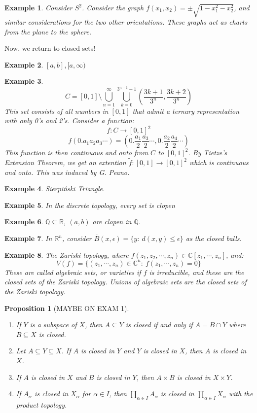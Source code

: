 \documentclass{article}
\newcommand{\R}{\mathbb{R}}
\newcommand{\C}{\mathbb{C}}
\newcommand{\Q}{\mathbb{Q}}
\newtheorem{example}{Example}
\newtheorem{proposition}{Proposition}
\begin{document}
 \begin{example}
 Consider $S^2$. Consider the graph $f(x_1,x_2)=\pm\sqrt{1-x_1^2-x_2^2}$, and similar considerations for the two other orientations. These graphs act as charts from the plane to the sphere.  
 \end{example}
 \noindent Now, we return to closed sets!
 \begin{example}
 $[a,b], [a,\infty)$
 \end{example}
 \begin{example}
 $$C=[0,1]\setminus\displaystyle\bigcup_{n=1}^\infty \bigcup_{k=0}^{3^{n-1}-1}\left(\frac{3k+1}{3^n},\frac{3k+2}{3^n}\right)$$
 This set consists of all numbers in $[0,1]$ that admit a ternary representation with only 0's and 2's. Consider a function:
 $$f: C\rightarrow [0,1]^2$$
 $$f(0.a_1a_2a_3\cdots) = (0.\frac{a_1}{2}\frac{a_3}{2}\cdots, 0.\frac{a_2}{2}\frac{a_4}{2}\cdots)$$
 This function is then continuous and onto from $C$ to $[0,1]^2$. By Tietze's Extension Theorem, we get an extention $\tilde{f}:[0,1]\rightarrow [0,1]^2$ which is continuous and onto. This was induced by G. Peano. 
 \end{example}
 \begin{example}
 Sierpi\'nski Triangle. 
 \end{example}
 \begin{example}
 In the discrete topology, every set is clopen
 \end{example}
 \begin{example}
 $\Q\subseteq \R$, $(a,b)$ are clopen in $\Q$.
 \end{example}
 \begin{example}
 In $\R^n$, consider $\overline{B}(x,\epsilon)=\{y:\ d(x,y)\leq \epsilon\}$ as the closed balls.
 \end{example}
 \begin{example}
 The Zariski topology, where $f(z_1,z_2,\cdots, z_n)\in \C[z_1,\cdots,z_n]$, and:
 $$V(f)=\{(z_1,\cdots, z_n)\in \C^n:\ f(z_1,\cdots, z_n)=0\}$$
 These are called algebraic sets, or varieties if $f$ is irreducible, and these are the closed sets of the Zariski topology. Unions of algebraic sets are the closed sets of the Zariski topology.
 \end{example}
 \begin{proposition}[MAYBE ON EXAM 1]
 \begin{enumerate}[(1)]
     \item If $Y$ is a subspace of $X$, then $A\subseteq Y$ is closed if and only if $A=B\cap Y$ where $B\subseteq X$ is closed.
     \item Let $A\subseteq Y\subseteq X$. If $A$ is closed in $Y$ and $Y$ is closed in $X$, then $A$ is closed in $X$.
     \item If $A$ is closed in $X$ and $B$ is closed in $Y$, then $A\times B$ is closed in $X\times Y$.
     \item If $A_\alpha$ is closed in $X_\alpha$ for $\alpha\in I$, then $\displaystyle\prod_{\alpha\in I}A_\alpha$ is closed in $\displaystyle\prod_{\alpha\in I}X_\alpha$ with the product topology.
 \end{enumerate}
 \end{proposition}
\end{document}
